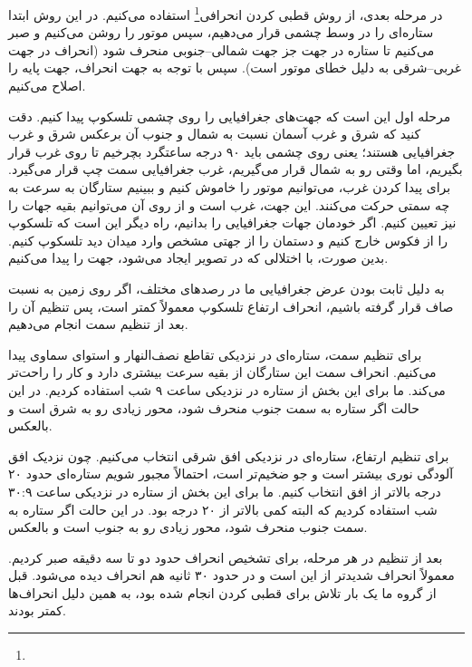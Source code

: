 \documentclass[12pt,a4paper]{article}
\begin{document}
	در مرحله بعدی، از روش قطبی کردن انحرافی\footnote{} استفاده می‌کنیم. در این روش ابتدا ستاره‌ای
	را در وسط چشمی قرار می‌دهیم، سپس موتور را روشن می‌کنیم و صبر می‌کنیم تا ستاره در جهت جز جهت شمالی--جنوبی منحرف شود
	(انحراف در جهت غربی--شرقی به دلیل خطای موتور است). سپس با توجه به جهت انحراف، جهت پایه را اصلاح می‌کنیم.
	
	مرحله اول این است که جهت‌های جغرافیایی را روی چشمی تلسکوپ پیدا کنیم. دقت کنید که شرق و غرب آسمان نسبت به شمال و
	جنوب آن برعکس شرق و غرب جغرافیایی هستند؛ یعنی روی چشمی باید ۹۰ درجه ساعتگرد بچرخیم تا روی غرب قرار بگیریم، اما
	وقتی رو به شمال قرار می‌گیریم، غرب جغرافیایی سمت چپ قرار می‌گیرد. برای پیدا کردن غرب، می‌توانیم موتور را خاموش کنیم
	و ببینیم ستارگان به سرعت به چه سمتی حرکت می‌کنند. این جهت، غرب است و از روی آن می‌توانیم بقیه جهات را نیز تعیین کنیم.
	اگر خودمان جهات جغرافیایی را بدانیم، راه دیگر این است که تلسکوپ را از فکوس خارج کنیم و دستمان را از جهتی مشخص وارد
	میدان دید تلسکوپ کنیم. بدین صورت، با اختلالی که در تصویر ایجاد می‌شود، جهت را پیدا می‌کنیم.
	
	به دلیل ثابت بودن عرض جغرافیایی ما در رصدهای مختلف، اگر روی زمین به نسبت صاف قرار گرفته باشیم،
	انحراف ارتفاع تلسکوپ معمولاً کمتر است، پس تنظیم آن را بعد از تنظیم سمت انجام می‌دهیم.
	
	برای تنظیم سمت، ستاره‌ای در نزدیکی تقاطع نصف‌النهار و استوای سماوی  پیدا می‌کنیم. انحراف سمت این ستارگان از بقیه
	سرعت بیشتری دارد و کار را راحت‌تر می‌کند. ما برای این بخش از ستاره  در نزدیکی ساعت ۹ شب استفاده کردیم. در این
	حالت اگر ستاره به سمت جنوب منحرف شود، محور زیادی رو به شرق است و بالعکس.
	
	برای تنظیم ارتفاع، ستاره‌ای در نزدیکی افق شرقی انتخاب می‌کنیم. چون نزدیک افق آلودگی نوری بیشتر است و جو ضخیم‌تر است،
	احتمالاً مجبور شویم ستاره‌ای حدود ۲۰ درجه بالاتر از افق انتخاب کنیم. ما برای این بخش از ستاره  در نزدیکی
	ساعت ۳۰:۹ شب استفاده کردیم که البته کمی بالاتر از ۲۰ درجه بود. در این حالت اگر ستاره به سمت جنوب منحرف شود،
	محور زیادی رو به جنوب است و بالعکس.
	
	بعد از تنظیم در هر مرحله، برای تشخیص انحراف حدود دو تا سه دقیقه صبر کردیم. معمولاً انحراف شدید‌تر از این است و در
	حدود ۳۰ ثانیه هم انحراف دیده می‌شود. قبل از گروه ما یک بار تلاش برای قطبی کردن انجام شده بود، به همین دلیل انحراف‌ها
	کمتر بودند.
\end{document}
